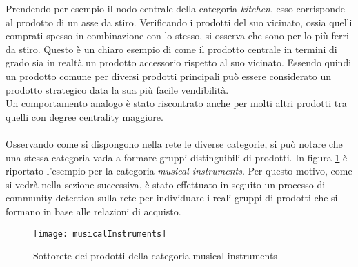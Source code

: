 Prendendo per esempio il nodo centrale della categoria \textit{kitchen}, esso corrisponde al prodotto di un asse da stiro. Verificando i prodotti del suo vicinato, ossia quelli comprati spesso in combinazione con lo stesso, si osserva che sono per lo più ferri da stiro. Questo è un chiaro esempio di come il prodotto centrale in termini di grado sia in realtà un prodotto accessorio rispetto al suo vicinato. Essendo quindi un prodotto comune per diversi prodotti principali può essere considerato un prodotto strategico data la sua più facile vendibilità. \\
Un comportamento analogo è stato riscontrato anche per molti altri prodotti tra quelli con degree centrality maggiore.
\\\\
Osservando come si dispongono nella rete le diverse categorie, si può notare che una stessa categoria vada a formare gruppi distinguibili di prodotti. In figura \ref{fig:musicalInstruments} è riportato l'esempio per la categoria \textit{musical-instruments}. Per questo motivo, come si vedrà nella sezione successiva, è stato effettuato in seguito un processo di community detection sulla rete per individuare i reali gruppi di prodotti che si formano in base alle relazioni di acquisto.

\begin{figure}[H]
    \texttt{[image: musicalInstruments]}\centering
    \caption{Sottorete dei prodotti della categoria musical-instruments}\label{fig:musicalInstruments}
\end{figure}

